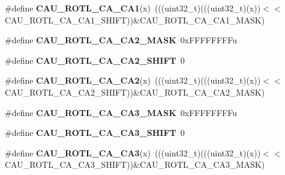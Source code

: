 \begin{DoxyCompactItemize}
\item 
\#define {\bfseries C\+A\+U\+\_\+\+R\+O\+T\+L\+\_\+\+C\+A\+\_\+\+C\+A1}(x)~(((uint32\+\_\+t)(((uint32\+\_\+t)(x))$<$$<$C\+A\+U\+\_\+\+R\+O\+T\+L\+\_\+\+C\+A\+\_\+\+C\+A1\+\_\+\+S\+H\+I\+FT))\&C\+A\+U\+\_\+\+R\+O\+T\+L\+\_\+\+C\+A\+\_\+\+C\+A1\+\_\+\+M\+A\+SK)\hypertarget{group__CAU__Register__Masks_gacb972ecc560e0270bf5f6f02fc7e8eda}{}\label{group__CAU__Register__Masks_gacb972ecc560e0270bf5f6f02fc7e8eda}

\item 
\#define {\bfseries C\+A\+U\+\_\+\+R\+O\+T\+L\+\_\+\+C\+A\+\_\+\+C\+A2\+\_\+\+M\+A\+SK}~0x\+F\+F\+F\+F\+F\+F\+F\+Fu\hypertarget{group__CAU__Register__Masks_ga747bae472035b772b9099ece284b7520}{}\label{group__CAU__Register__Masks_ga747bae472035b772b9099ece284b7520}

\item 
\#define {\bfseries C\+A\+U\+\_\+\+R\+O\+T\+L\+\_\+\+C\+A\+\_\+\+C\+A2\+\_\+\+S\+H\+I\+FT}~0\hypertarget{group__CAU__Register__Masks_ga8b25b4c825c9173a0abd5efdd58a82e4}{}\label{group__CAU__Register__Masks_ga8b25b4c825c9173a0abd5efdd58a82e4}

\item 
\#define {\bfseries C\+A\+U\+\_\+\+R\+O\+T\+L\+\_\+\+C\+A\+\_\+\+C\+A2}(x)~(((uint32\+\_\+t)(((uint32\+\_\+t)(x))$<$$<$C\+A\+U\+\_\+\+R\+O\+T\+L\+\_\+\+C\+A\+\_\+\+C\+A2\+\_\+\+S\+H\+I\+FT))\&C\+A\+U\+\_\+\+R\+O\+T\+L\+\_\+\+C\+A\+\_\+\+C\+A2\+\_\+\+M\+A\+SK)\hypertarget{group__CAU__Register__Masks_ga75488166e5d5cb963886e5df06554dcb}{}\label{group__CAU__Register__Masks_ga75488166e5d5cb963886e5df06554dcb}

\item 
\#define {\bfseries C\+A\+U\+\_\+\+R\+O\+T\+L\+\_\+\+C\+A\+\_\+\+C\+A3\+\_\+\+M\+A\+SK}~0x\+F\+F\+F\+F\+F\+F\+F\+Fu\hypertarget{group__CAU__Register__Masks_gac3bb01fa4c02a43a9367a61519d287f2}{}\label{group__CAU__Register__Masks_gac3bb01fa4c02a43a9367a61519d287f2}

\item 
\#define {\bfseries C\+A\+U\+\_\+\+R\+O\+T\+L\+\_\+\+C\+A\+\_\+\+C\+A3\+\_\+\+S\+H\+I\+FT}~0\hypertarget{group__CAU__Register__Masks_gaefb05fe2e03750f3f2123bb5014e8d80}{}\label{group__CAU__Register__Masks_gaefb05fe2e03750f3f2123bb5014e8d80}

\item 
\#define {\bfseries C\+A\+U\+\_\+\+R\+O\+T\+L\+\_\+\+C\+A\+\_\+\+C\+A3}(x)~(((uint32\+\_\+t)(((uint32\+\_\+t)(x))$<$$<$C\+A\+U\+\_\+\+R\+O\+T\+L\+\_\+\+C\+A\+\_\+\+C\+A3\+\_\+\+S\+H\+I\+FT))\&C\+A\+U\+\_\+\+R\+O\+T\+L\+\_\+\+C\+A\+\_\+\+C\+A3\+\_\+\+M\+A\+SK)\hypertarget{group__CAU__Register__Masks_gafdde8a37c0517f2bc5637da808ef9252}{}\label{group__CAU__Register__Masks_gafdde8a37c0517f2bc5637da808ef9252}


\end{DoxyCompactItemize}
